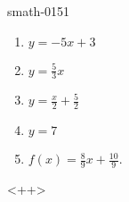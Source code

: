 
\begin{corrige}{smath-0151}

    \begin{enumerate}
        \item
            \( y=-5x+3\)
        \item
            \( y=\frac{ 5 }{ 3 }x\)
        \item
            \( y=\frac{ x }{2}+\frac{ 5 }{2}\)
        \item
            \( y=7\)
        \item
            \( f(x)=\frac{ 8 }{ 9 }x+\frac{ 10 }{ 9 }\).
    \end{enumerate}
    <++>

\end{corrige}
